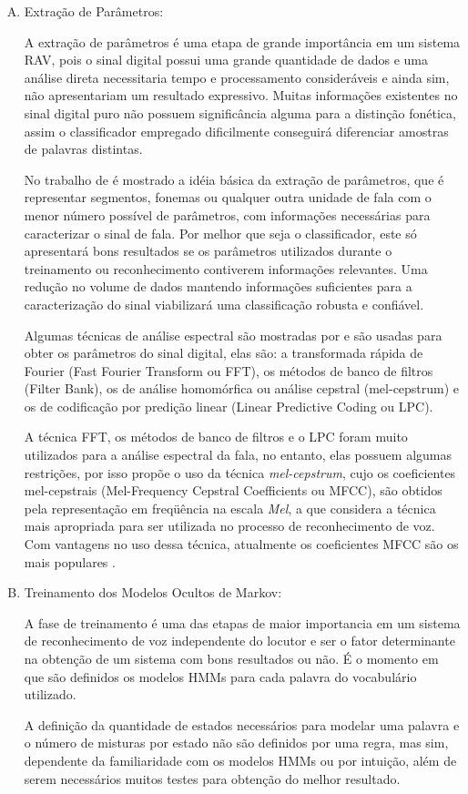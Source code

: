 \begin{enumerate}[A)]
\item Extração de Parâmetros:

A extração de parâmetros é uma etapa de grande importância em um sistema RAV, pois o sinal digital possui uma grande quantidade de dados e uma análise direta necessitaria tempo e processamento consideráveis e ainda sim, não apresentariam um resultado expressivo. Muitas informações existentes no sinal digital puro não possuem significância alguma para a distinção fonética, assim o classificador empregado dificilmente conseguirá diferenciar amostras de palavras distintas.

No trabalho de  é mostrado a idéia básica da extração de parâmetros, que é representar segmentos, fonemas ou qualquer outra unidade de fala com o menor número possível de parâmetros, com informações necessárias para caracterizar o sinal de fala. Por melhor que seja o classificador, este só apresentará bons resultados se os parâmetros utilizados durante o treinamento ou reconhecimento contiverem informações relevantes. Uma redução no volume de dados mantendo informações suficientes para a caracterização do sinal viabilizará uma classificação robusta e confiável.

Algumas técnicas de análise espectral são mostradas por  e são usadas para obter os parâmetros do sinal digital, elas são: a transformada rápida de Fourier (Fast Fourier Transform ou FFT), os métodos de banco de filtros (Filter Bank), os de análise homomórfica ou análise cepstral (mel-cepstrum) e os de codificação por
predição linear (Linear Predictive Coding ou LPC).

A técnica FFT, os métodos de banco de filtros e o LPC foram muito utilizados para a análise espectral da fala, no entanto, elas possuem algumas restrições, por isso  propõe o uso da técnica \textit{mel-cepstrum}, cujo os coeficientes mel-cepstrais (Mel-Frequency Cepstral Coefficients ou MFCC), são obtidos pela representação em freqüência na escala \textit{Mel}, a que considera a técnica mais apropriada para ser
utilizada no processo de reconhecimento de voz. Com vantagens no uso dessa técnica, atualmente os coeficientes MFCC
são os mais populares \cite{IsolatWordBouroba}.
\item Treinamento dos Modelos Ocultos de Markov:

A fase de treinamento é uma das etapas de maior importancia em um sistema de reconhecimento de voz independente do locutor e ser o fator determinante na obtenção de um sistema com bons resultados ou não. É o momento em que são definidos os modelos HMMs para cada palavra do vocabulário utilizado.

A definição da quantidade de estados necessários para modelar uma palavra e o número de misturas por estado não são definidos por uma regra, mas sim, dependente da familiaridade com os modelos HMMs ou por intuição, além de serem necessários muitos testes para obtenção do melhor resultado. 
\end{enumerate}

